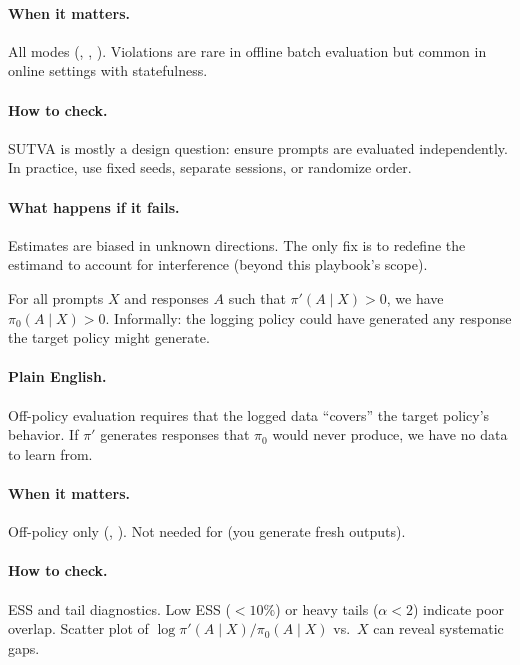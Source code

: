 \paragraph{When it matters.} All modes (\dm, \ips, \dr). Violations are rare in offline batch evaluation but common in online settings with statefulness.

\paragraph{How to check.} SUTVA is mostly a design question: ensure prompts are evaluated independently. In practice, use fixed seeds, separate sessions, or randomize order.

\paragraph{What happens if it fails.} Estimates are biased in unknown directions. The only fix is to redefine the estimand to account for interference (beyond this playbook's scope).

\begin{assumption}
\label{assum:overlap}
For all prompts $X$ and responses $A$ such that $\pi'(A \mid X) > 0$, we have $\pi_0(A \mid X) > 0$. Informally: the logging policy could have generated any response the target policy might generate.
\end{assumption}

\paragraph{Plain English.} Off-policy evaluation requires that the logged data ``covers'' the target policy's behavior. If $\pi'$ generates responses that $\pi_0$ would never produce, we have no data to learn from.

\paragraph{When it matters.} Off-policy only (\ips, \dr). Not needed for \dm{} (you generate fresh outputs).

\paragraph{How to check.} ESS and tail diagnostics. Low ESS ($< 10\%$) or heavy tails ($\alpha < 2$) indicate poor overlap. Scatter plot of $\log \pi'(A \mid X) / \pi_0(A \mid X)$ vs.\ $X$ can reveal systematic gaps.

